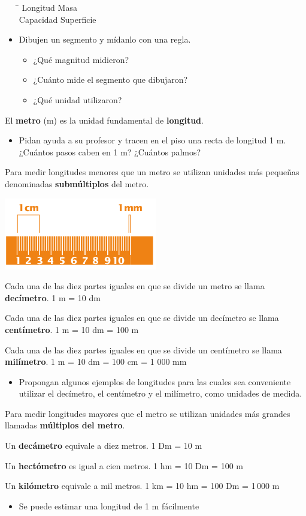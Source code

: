 \documentclass[letterpaper,11pt,twoside]{article}
\begin{document}
\begin{multicols}{2}
\begin{itemize}
\begin{tabbing}
\hspace{3cm}\=\kill
Longitud \> Masa \\ 
Capacidad \> Superficie 
\end{tabbing}
\item Dibujen un segmento y mídanlo con una regla.
\begin{itemize}
\item ¿Qué magnitud midieron?
\item ¿Cuánto mide el segmento que dibujaron?
\item ¿Qué unidad utilizaron?
\end{itemize}
\end{itemize}
El \textbf{metro} (m) es la unidad fundamental de \textbf{longitud}.
\begin{itemize}
\item Pidan ayuda a su profesor y tracen en el piso una recta de longitud 1 m. ¿Cuántos pasos caben en 1 m? ¿Cuántos palmos?
\end{itemize}
Para medir longitudes menores que un metro se utilizan unidades más pequeñas denominadas \textbf{submúltiplos} del metro.
\begin{center}
\includegraphics[scale=.9]{Images/regla.png} 
\end{center}
Cada una de las diez partes iguales en que se divide un metro se llama \textbf{decímetro}. 1 m = 10 dm

Cada una de las diez partes iguales en que se divide un decímetro se llama \textbf{centímetro}. 1 m = 10 dm = 100 m

Cada una de las diez partes iguales en que se divide un centímetro se llama \textbf{milímetro}. 1 m = 10 dm = 100 cm = 1 000 mm
\begin{itemize}
\item Propongan algunos ejemplos de longitudes para las cuales sea conveniente utilizar el decímetro, el centímetro y el milímetro, como unidades de medida.
\end{itemize}
Para medir longitudes mayores que el metro se utilizan unidades más grandes llamadas \textbf{múltiplos del metro}.

Un \textbf{decámetro} equivale a diez metros. 1 Dm = 10 m

Un \textbf{hectómetro} es igual a cien metros. 1 hm = 10 Dm = 100 m

Un \textbf{kilómetro} equivale a mil metros. 1 km = 10 hm = 100 Dm = 1\,000 m
\begin{itemize}
\item Se puede estimar una longitud de 1 m fácilmente
\end{itemize}
\end{multicols}
\end{document}
